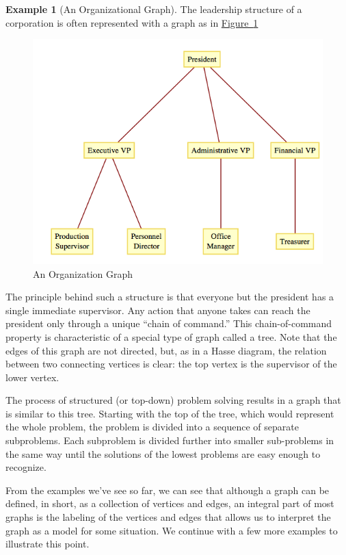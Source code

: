 \documentclass[10pt,]{book}
\theoremstyle{plain}
\theoremstyle{definition}
\theoremstyle{definition}
\theoremstyle{definition}
\newtheorem{example}[theorem]{Example}
\theoremstyle{definition}
\theoremstyle{definition}
\numberwithin{equation}{section}
\begin{document}
\begin{example}[An Organizational Graph]\label{organizational-graph}
The leadership structure of a corporation is often represented with a graph as in \hyperref[fig-organization-9-1]{Figure~\ref{fig-organization-9-1}} %
\leavevmode%
\begin{figure}
\centering
\includegraphics[width=1\linewidth]{images/fig-organization-9-1.png}
\caption{An Organization Graph
                \label{fig-organization-9-1}}
\end{figure}
\par
The principle behind such a structure is that everyone but the president has a single immediate supervisor. Any action that anyone takes can reach
the president only through a unique ``chain of command.'' This chain-of-command property is characteristic of a special type of graph called
a  tree. Note that the edges of this graph are not directed, but, as in a Hasse diagram, the relation between two connecting vertices is
clear: the top vertex is the supervisor of the lower vertex.%
\par
The process of structured (or top-down) problem solving results in a graph that is similar to this tree. Starting with the top of the tree, which
would represent the whole problem, the problem is divided into a sequence of separate subproblems. Each subproblem is divided further into smaller
sub-problems in the same way until the solutions of the lowest problems are easy enough to recognize.
%
\end{example}
\par
From the examples we've see so far, we can see that although a graph can be defined, in short, as a collection of vertices and edges, an integral part of most graphs is the labeling of the vertices and edges that allows us to interpret the graph as a model for some situation. We continue with a few more examples to illustrate this point.%
\end{document}
